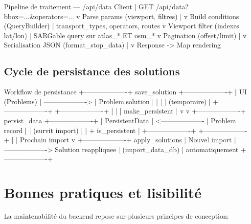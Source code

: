 \begin{codebox}{Pipeline de traitement — /api/data}
Client
  | GET /api/data?bbox=...&operators=...
  v
Parse params (viewport, filtres)
  | 
  v
Build conditions (QueryBuilder)
  | transport_types, operators, routes
  v
Viewport filter (indexes lat/lon)
  | SARGable query sur atlas_* ET osm_*
  v
Pagination (offset/limit)
  | 
  v
Serialisation JSON (format_stop_data)
  | 
  v
Response -> Map rendering
\end{codebox}

\subsection*{Cycle de persistance des solutions}

\begin{codebox}{Workflow de persistance}
+-------------------+    save_solution     +-------------------+
| UI (Problems)     | -------------------> | Problem.solution  |
|                   |                      | (temporaire)      |
+-------------------+                      +-------------------+
        |                                           |
        | make_persistent                           |
        v                                           v
+-------------------+    persist_data      +-------------------+
| PersistentData    | <------------------- | Problem record    |
| (survit import)   |                      | + is_persistent   |
+-------------------+                      +-------------------+
        |                                         
        | Prochain import                         
        v                                         
+-------------------+    apply_solutions   
| Nouvel import     | -------------------> Solution reappliquee
| (import_data_db)  |                      automatiquement
+-------------------+                      
\end{codebox}

\section{Bonnes pratiques et lisibilité}

La maintenabilité du backend repose sur plusieurs principes de conception:

